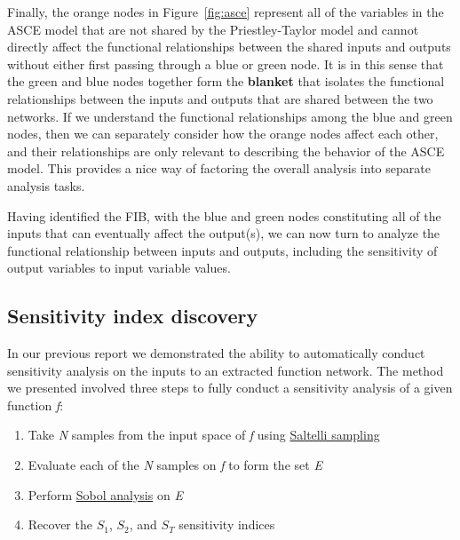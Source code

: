 \documentclass[article, 12pt, oneside]{memoir}
\begin{document}
Finally, the orange nodes in Figure~\ref{fig:asce} represent all of the variables in the ASCE
model that are not shared by the Priestley-Taylor model and cannot
directly affect the functional relationships between the shared inputs
and outputs without either first passing through a blue or green node.
It is in this sense that the green and blue nodes together form the
\textbf{blanket} that isolates the functional relationships between the
inputs and outputs that are shared between the two networks. If we
understand the functional relationships among the blue and green nodes,
then we can separately consider how the orange nodes affect each other,
and their relationships are only relevant to describing the behavior of
the ASCE model. This provides a nice way of factoring the overall
analysis into separate analysis tasks.

Having identified the FIB, with the blue and green nodes constituting
all of the inputs that can eventually affect the output(s), we can now
turn to analyze the functional relationship between inputs and outputs,
including the sensitivity of output variables to input variable values.

\hypertarget{sensitivity-index-discovery}{%
\subsection{Sensitivity index
discovery}\label{sensitivity-index-discovery}}

In our previous report we demonstrated the ability to automatically
conduct sensitivity analysis on the inputs to an extracted function
network. The method we presented involved three steps to fully conduct a
sensitivity analysis of a given function \emph{f}:

\begin{enumerate}
\def\labelenumi{\arabic{enumi}.}
\tightlist
\item
  Take \emph{N} samples from the input space of \emph{f} using
  \href{https://en.wikipedia.org/wiki/Variance-based_sensitivity_analysis}{Saltelli
  sampling}
\item
  Evaluate each of the \emph{N} samples on \emph{f} to form the set
  \emph{E}
\item
  Perform
  \href{https://en.wikipedia.org/wiki/Variance-based_sensitivity_analysis}{Sobol
  analysis} on \emph{E}
\item
  Recover the \(S_1\), \(S_2\), and \(S_T\) sensitivity indices
\end{enumerate}
\end{document}
